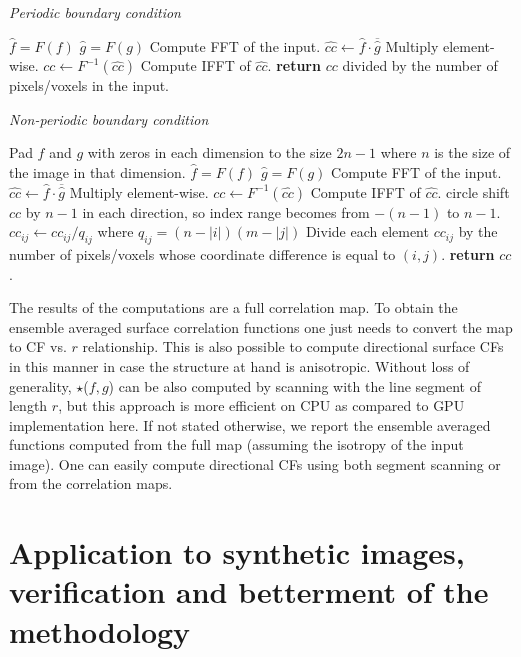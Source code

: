 \documentclass[reprint,amsmath,amssymb,aps,pre,showkeys,showpacs]{revtex4-1}
\begin{document}
\textit{Periodic boundary condition}
\begin{algorithmic}[1]
  \State $\hat{f} = F(f)$
  \State $\hat{g} = F(g)$
  \Comment Compute FFT of the input.
  \State $\hat{cc} \gets \hat{f} \cdot \overline{\hat{g}}$
  \Comment Multiply element-wise.
  \State $cc \gets F^{-1}(\hat{cc})$
  \Comment Compute IFFT of $\hat{cc}$.
  \State \textbf{return} $cc$ divided by the number of pixels/voxels in the input.
  \EndProcedure
\end{algorithmic}

\textit{Non-periodic boundary condition}
\begin{algorithmic}[1]
  \State Pad $f$ and $g$ with zeros in each dimension to the size $2n-1$ where
  $n$ is the size of the image in that dimension.
  \State $\hat{f} = F(f)$
  \State $\hat{g} = F(g)$
  \Comment Compute FFT of the input.
  \State $\hat{cc} \gets \hat{f} \cdot \overline{\hat{g}}$
  \Comment Multiply element-wise.
  \State $cc \gets F^{-1}(\hat{cc})$
  \Comment Compute IFFT of $\hat{cc}$.
  \State circle shift $cc$ by $n - 1$ in each direction, so index range becomes
  from $-(n - 1)$ to $n - 1$.
  \State $cc_{ij} \gets cc_{ij} / q_{ij}$ where $q_{ij} = (n - |i|)(m - |j|)$
  \Comment Divide each element $cc_{ij}$ by the number of pixels/voxels whose
  coordinate difference is equal to $(i, j)$.
  \State \textbf{return} $cc$.
  \EndProcedure
\end{algorithmic}

The results of the computations are a full correlation map. To obtain the
ensemble averaged surface correlation functions one just needs to convert the
map to CF vs. $r$ relationship. This is also possible to compute directional
surface CFs in this manner in case the structure at hand is anisotropic. Without
loss of generality, $\star$($f, g$) can be also computed by scanning with the
line segment of length $r$, but this approach is more efficient on CPU as
compared to GPU implementation here. If not stated otherwise, we report the
ensemble averaged functions computed from the full map (assuming the isotropy of
the input image). One can easily compute directional CFs
\cite{jiao2014chawla,EPL1} using both segment scanning or from the correlation
maps.

\section{Application to synthetic images, verification and betterment of the methodology}
\label{sec:results}
\end{document}
